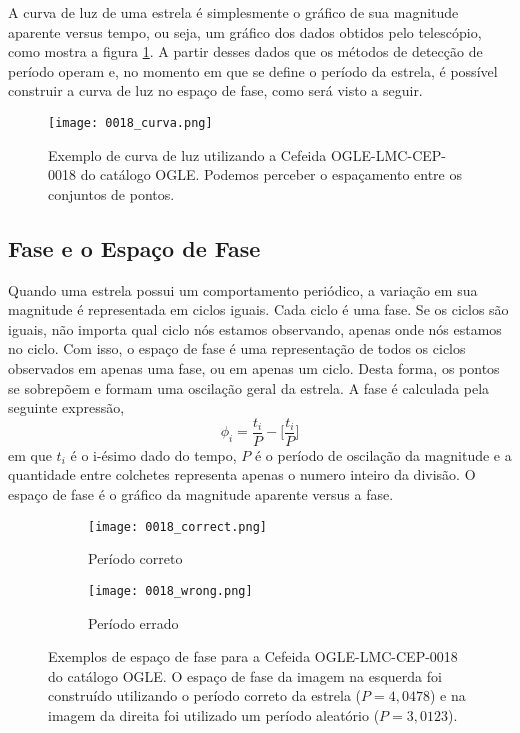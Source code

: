 A curva de luz de uma estrela é simplesmente o gráfico de sua magnitude aparente versus tempo, ou seja, um gráfico dos dados obtidos pelo telescópio, como mostra a figura \ref{fig:curva_luz}. A partir desses dados que os métodos de detecção de período operam e, no momento em que se define o período da estrela, é possível construir a curva de luz no espaço de fase, como será visto a seguir.

\begin{figure}[!ht]
\centering
\texttt{[image: 0018\_curva.png]}
\caption[Exemplo de curva de luz]{Exemplo de curva de luz utilizando a Cefeida OGLE-LMC-CEP-0018 do catálogo OGLE. Podemos perceber o espaçamento entre os conjuntos de pontos.}
\label{fig:curva_luz}
\end{figure}


\subsection{Fase e o Espaço de Fase}

Quando uma estrela possui um comportamento periódico, a variação em sua magnitude é representada em ciclos iguais. Cada ciclo é uma fase. Se os ciclos são iguais, não importa qual ciclo nós estamos observando, apenas onde nós estamos no ciclo. Com isso, o espaço de fase é uma representação de todos os ciclos observados em apenas uma fase, ou em apenas um ciclo. Desta forma, os pontos se sobrepõem e formam uma oscilação geral da estrela. A fase é calculada pela seguinte expressão,
\begin{equation}
\phi_i = \frac{t_i}{P} - \Big[\frac{t_i}{P}\Big]
\end{equation}
em que $t_i$ é o i-ésimo dado do tempo, $P$ é o período de oscilação da magnitude e a quantidade entre colchetes representa apenas o numero inteiro da divisão. O espaço de fase é o gráfico da magnitude aparente versus a fase.


\begin{figure}[!ht]
\centering
\begin{subfigure}{.5\textwidth}
  \centering
  \texttt{[image: 0018\_correct.png]}
  \caption{Período correto}
  \label{fig:right}
\end{subfigure}%
\begin{subfigure}{.5\textwidth}
  \centering
  \texttt{[image: 0018\_wrong.png]}
  \caption{Período errado}
  \label{fig:wrong}
\end{subfigure}
\caption[Exemplos de espaço de fase]{Exemplos de espaço de fase para a Cefeida OGLE-LMC-CEP-0018 do catálogo OGLE. O espaço de fase da imagem na esquerda foi construído utilizando o período correto da estrela ($P=4,0478$) e na imagem da direita foi utilizado um período aleatório ($P=3,0123$).}
\label{fig:exemplo_fase}
\end{figure}

